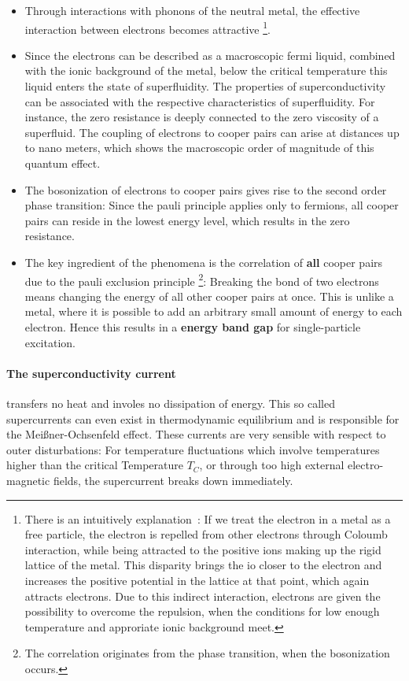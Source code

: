 \begin{itemize}
\item Through interactions with phonons of the neutral metal, the effective interaction between electrons becomes attractive
\footnote{There is an intuitively explanation~\cite{cooper1956bound}: If we treat the electron in a metal
as a free particle, the electron is repelled from other electrons through Coloumb interaction, while
being attracted to the positive ions making up the rigid lattice of the metal. This disparity 
brings the io closer to the electron and increases the positive potential in the lattice at that point, which again
attracts electrons. Due to this indirect interaction, electrons are given the possibility to overcome the repulsion,
when the conditions for low enough temperature and approriate ionic background meet.
}. 
\item Since the electrons can be described as a macroscopic fermi liquid, combined with the ionic background of the metal, 
below the critical temperature this liquid enters the state of superfluidity. The properties of superconductivity can be 
associated with the respective characteristics of superfluidity. For instance, the zero resistance is deeply connected 
to the zero viscosity of a superfluid. The coupling of electrons to cooper pairs can arise at distances up to nano meters,
which shows the macroscopic order of magnitude of this quantum effect.
\item The bosonization of electrons to cooper pairs gives rise to the second order phase transition: Since 
the pauli principle applies only to fermions, all cooper pairs can reside in the lowest energy level,
which results in the zero resistance. 
\item The key ingredient of the phenomena is the correlation of \textbf{all} cooper pairs due to the pauli exclusion principle
\footnote{The correlation originates from the phase transition, when the bosonization occurs.}:
Breaking the bond of two electrons means changing the energy of all other cooper pairs at once. This is unlike a metal, where
it is possible to add an arbitrary small amount of energy to each electron. Hence this results in a \textbf{energy band gap} for 
single-particle excitation.
\end{itemize}   
\paragraph{The superconductivity current} transfers no heat and involes
 no dissipation of energy. This 
so called supercurrents can even exist in thermodynamic equilibrium and
is responsible for the Meißner-Ochsenfeld effect. These currents are very
sensible with respect to outer disturbations: For temperature fluctuations
which involve temperatures higher than the critical Temperature $T_C$, 
or through too high external electro-magnetic fields, the supercurrent
breaks down immediately. 
